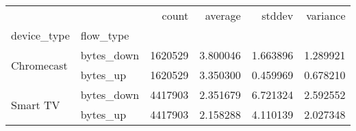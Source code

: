 \begin{tabular}{llrrrr}
\toprule
 &  & count & average & stddev & variance \\
device_type & flow_type &  &  &  &  \\
\midrule
\multirow[t]{2}{*}{Chromecast} & bytes\_down & 1620529 & 3.800046 & 1.663896 & 1.289921 \\
 & bytes\_up & 1620529 & 3.350300 & 0.459969 & 0.678210 \\
\cline{1-6}
\multirow[t]{2}{*}{Smart TV} & bytes\_down & 4417903 & 2.351679 & 6.721324 & 2.592552 \\
 & bytes\_up & 4417903 & 2.158288 & 4.110139 & 2.027348 \\
\cline{1-6}
\bottomrule
\end{tabular}
